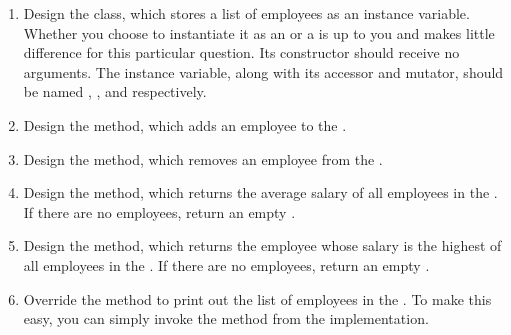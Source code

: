 \begin{enumerate}[label=(\alph*)]
    \item Design the  class, which stores a list of employees  as an instance variable. Whether you choose to instantiate it as an  or a  is up to you and makes little difference for this particular question. Its constructor should receive no arguments. The instance variable, along with its accessor and mutator, should be named , , and  respectively.
    \item Design the  method, which adds an employee to the .
    \item Design the  method, which removes an employee from the .
    \item Design the  method, which returns the average salary of all employees in the . If there are no employees, return an empty .
    \item Design the  method, which returns the employee whose salary is the highest of all employees in the . If there are no employees, return an empty .
    \item Override the  method to print out the list of employees in the . To make this easy, you can simply invoke the  method from the  implementation.
\end{enumerate}


